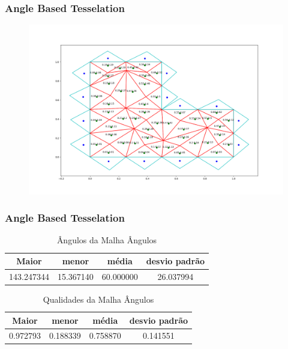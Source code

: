\documentclass{beamer}
\begin{document}
\begin{frame}
  \frametitle{Angle Based Tesselation}

  \begin{figure}
    \includegraphics[width=0.6\linewidth]{malha-angulos.png}
  \end{figure}

\end{frame}
\begin{frame}
  \frametitle{Angle Based Tesselation}

  \begin{table}[hb]
    \centering
    \par\caption{Ângulos da Malha Ângulos}
    \begin{tabular}{c|c|c|c}
      Maior      & menor     & média     & desvio padrão \\\hline\hline
      143.247344 & 15.367140 & 60.000000 & 26.037994     \\\hline
    \end{tabular}
    \label{tab:angulos-malha-angulos}
  \end{table}

  \begin{table}[hb]
    \centering
    \par\caption{Qualidades da Malha Ângulos}
    \begin{tabular}{c|c|c|c}
      Maior    & menor    & média    & desvio padrão \\\hline\hline
      0.972793 & 0.188339 & 0.758870 & 0.141551      \\\hline
    \end{tabular}
    \label{tab:qualidades-malha-angulos}
  \end{table}

\end{frame}
\end{document}
